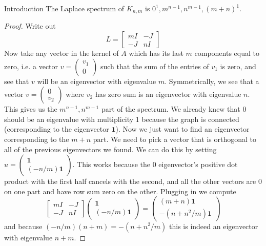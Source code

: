 \documentclass{article}
\begin{document}
\begin{section}{Introduction}
      The Laplace spectrum of $K_{n,m}$ is $0^1, m^{n-1}, n^{m-1}, (m+n)^1$.
      \begin{proof}
      Write out
      $$
      L = \begin{bmatrix} mI & -J \\
                          -J & nI
	  \end{bmatrix}
      $$
      Now take any vector in the kernel of $A$ which has its last $m$ components equal to zero, i.e. a vector $v = \begin{pmatrix} v_1 \\ 0 \end{pmatrix}$ such that the sum of the entries of $v_1$ is zero, and see that $v$ will be an eigenvector with eigenvalue $m$.
      Symmetrically, we see that a vector $v = \begin{pmatrix} 0 \\ v_2 \end{pmatrix}$ where $v_2$ has zero sum is an eigenvector with eigenvalue $n$.
     This gives us the $m^{n-1}, n^{m-1}$ part of the spectrum.
     We already knew that $0$ should be an eigenvalue with multiplicity 1 because the graph is connected (corresponding to the eigenvector $\mathbf 1$).
     Now we just want to find an eigenvector corresponding to the $m+n$ part.
     We need to pick a vector that is orthogonal to all of the previous eigenvectors we found.
     We can do this by setting $u = \begin{pmatrix} \mathbf 1 \\ (-n/m) \mathbf 1\end{pmatrix}$.
     This works because the $0$ eigenvector's positive dot product with the first half cancels with the second, and all the other vectors are 0 on one part and have row sum zero on the other.
    Plugging in we compute
    $$
    \begin{bmatrix} mI & -J \\
                   -J & nI
    \end{bmatrix}
    \begin{pmatrix}
      \mathbf 1\\
      (-n/m)\mathbf 1
    \end{pmatrix}
    =
    \begin{pmatrix}
      (m+n)\mathbf 1\\
      -(n + n^2/m) \mathbf 1
    \end{pmatrix}
    $$
    and because $(-n/m)(n+m) = -(n+n^2/m)$ this is indeed an eigenvector with eigenvalue $n+m$.
    \end{proof}


\end{section}
\end{document}
